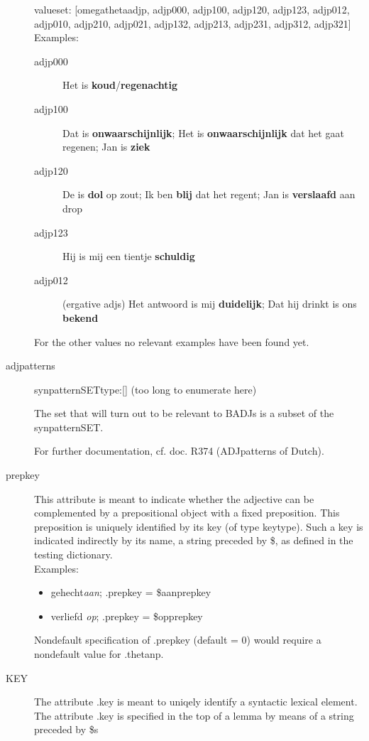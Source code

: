 \begin{description}
valueset: [omegathetaadjp, adjp000, adjp100, adjp120, 
                          adjp123, adjp012, adjp010, adjp210, adjp021,
                          adjp132, adjp213, adjp231, adjp312, adjp321]\\
                         
Examples:\\
\begin{description}
  \item [adjp000] Het is {\bf koud}/{\bf regenachtig}
  \item [adjp100] Dat is {\bf onwaarschijnlijk}; Het is {\bf onwaarschijnlijk}
dat het gaat regenen; Jan is {\bf ziek}
  \item [adjp120] De is {\bf dol} op zout; Ik ben {\bf blij} dat het regent;
Jan is {\bf verslaafd} aan drop
  \item [adjp123]
Hij is mij een tientje {\bf schuldig}
  \item [adjp012] (ergative adjs) Het antwoord is mij {\bf duidelijk}; Dat hij 
drinkt is ons {\bf bekend}
\end{description}

For the other values no relevant examples have been found yet.

\newpage
\item 
[adjpatterns]\mbox{}
synpatternSETtype:[] (too long to enumerate here)

The set that will turn out to be relevant to BADJs is a subset
of the synpatternSET.

For further documentation, cf. doc. R374 (ADJpatterns of Dutch).

\newpage
\item
[prepkey]\mbox{}

This attribute is meant to indicate whether the adjective can be complemented
by a prepositional object with a fixed preposition. 
This preposition is uniquely identified by its key (of type keytype).
Such a key is indicated indirectly by its name, a string preceded
by \$, as defined in the testing dictionary.\\

Examples:
\begin{itemize}
  \item 
 gehecht{\em aan}; .prepkey = \$aanprepkey
  \item
 verliefd {\em op}; .prepkey = \$opprepkey
\end{itemize}

Nondefault specification of .prepkey
(default = 0) would require a nondefault value for .thetanp.

\newpage
\item 
[KEY]\mbox{}

The attribute .key is meant to uniqely identify a syntactic lexical element.\\

The attribute .key is specified in the top of a lemma by means of a string
preceded by \$s
\end{description}

